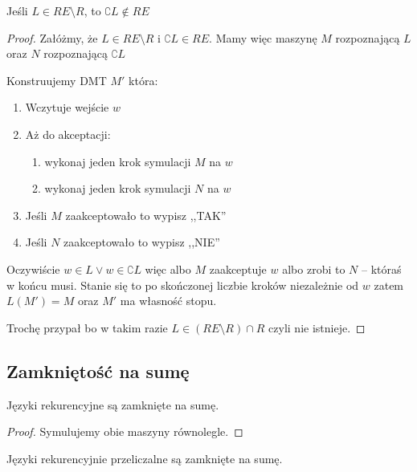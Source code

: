 \begin{theorem}
    Jeśli \( L \in RE \setminus R \), to \( \complement{L} \not \in RE\) 
\end{theorem}
\begin{proof}
    Załóżmy, że \( L \in RE \setminus R \) i \( \complement{L} \in RE\). 
    Mamy więc maszynę \( M \) rozpoznającą \( L \) oraz \( N \) rozpoznającą \( \complement{L} \)
    
    Konstruujemy DMT \( M' \) która:
    \begin{enumerate}
        \item Wczytuje wejście \( w \)
        \item Aż do akceptacji:
        \begin{enumerate}
            \item wykonaj jeden krok symulacji \( M \) na \( w \)
            \item wykonaj jeden krok symulacji \( N \) na \( w \)
        \end{enumerate}
        \item Jeśli \( M \) zaakceptowało to wypisz ,,TAK''
        \item Jeśli \( N \) zaakceptowało to wypisz ,,NIE''
    \end{enumerate}
    
    Oczywiście \( w \in L \lor w \in \complement{L} \) więc albo \( M \) zaakceptuje \( w \) albo zrobi to \( N \) -- któraś w końcu musi.
    Stanie się to po skończonej liczbie kroków niezależnie od \( w \) zatem \( L(M') = M \) oraz \( M' \) ma własność stopu.
    
    Trochę przypał bo w takim razie \( L \in (RE \setminus R) \cap R \) czyli nie istnieje.
    
\end{proof}

\subsection{Zamkniętość na sumę}

\begin{theorem}
    Języki rekurencyjne są zamknięte na sumę.
\end{theorem}

\begin{proof}
    Symulujemy obie maszyny równolegle.
\end{proof}

\begin{theorem}
    Języki rekurencyjnie przeliczalne są zamknięte na sumę.
\end{theorem}

